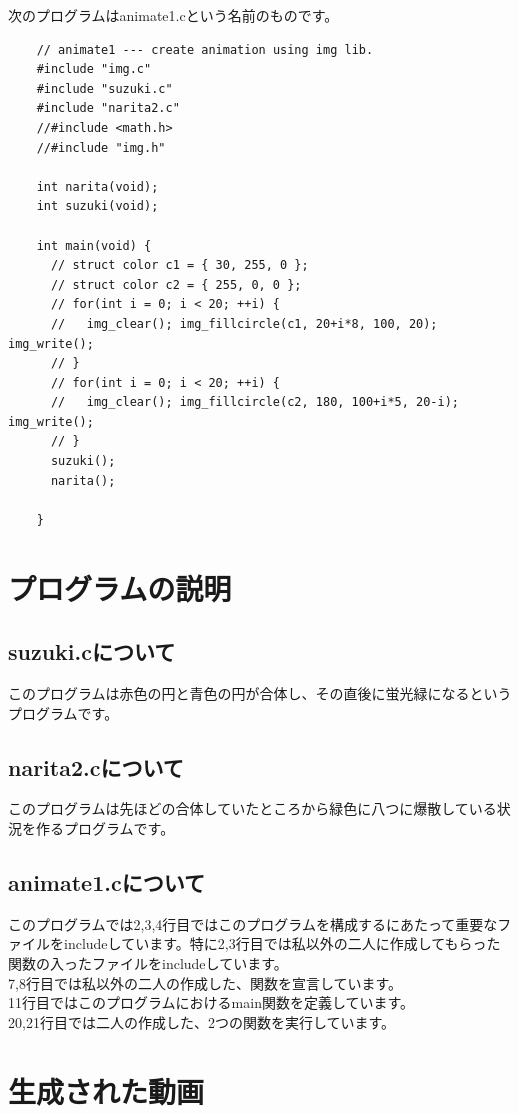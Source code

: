\documentclass[12pt,a4j]{jarticle}
\begin{document}
次のプログラムはanimate1.cという名前のものです。
\begin{verbatim}
    // animate1 --- create animation using img lib.
    #include "img.c"
    #include "suzuki.c"
    #include "narita2.c"
    //#include <math.h>
    //#include "img.h"
    
    int narita(void);
    int suzuki(void);
    
    int main(void) {
      // struct color c1 = { 30, 255, 0 };
      // struct color c2 = { 255, 0, 0 };
      // for(int i = 0; i < 20; ++i) {
      //   img_clear(); img_fillcircle(c1, 20+i*8, 100, 20); img_write();
      // }
      // for(int i = 0; i < 20; ++i) {
      //   img_clear(); img_fillcircle(c2, 180, 100+i*5, 20-i); img_write();
      // } 
      suzuki();
      narita();
    
    }
\end{verbatim}

\section{プログラムの説明}
\subsection{suzuki.cについて}
このプログラムは赤色の円と青色の円が合体し、その直後に蛍光緑になるというプログラムです。
\subsection{narita2.cについて}
このプログラムは先ほどの合体していたところから緑色に八つに爆散している状況を作るプログラムです。
\subsection{animate1.cについて}
このプログラムでは2,3,4行目ではこのプログラムを構成するにあたって重要なファイルをincludeしています。特に2,3行目では私以外の二人に作成してもらった関数の入ったファイルをincludeしています。\\
7,8行目では私以外の二人の作成した、関数を宣言しています。\\
11行目ではこのプログラムにおけるmain関数を定義しています。\\
20,21行目では二人の作成した、2つの関数を実行しています。

\section{生成された動画}
\end{document}
